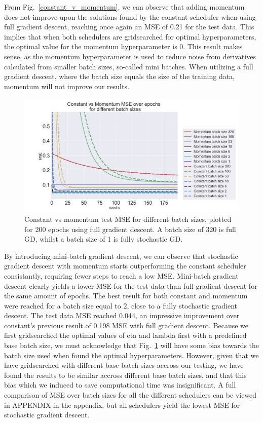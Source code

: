 \documentclass[onecolumn,10pt,cleanfoot]{asme2ej}
\begin{document}
From  Fig.~\ref{constant_v_momentum}, we can observe that adding momentum does not improve upon the solutions found by the constant scheduler when using full gradient descent, reaching once again an MSE of 0.21 for the test data. This implies that when both schedulers are gridsearched for optimal hyperparameters, the optimal value for the momentum hyperparameter is 0. This result makes sense, as the momentum hyperparameter is used to reduce noise from derivatives calculated from smaller batch sizes, so-called mini batches. When utilizing a full gradient descent, where the batch size equals the size of the training data, momentum will not improve our results.

\begin{figure}[h]
\centerline{\includegraphics[width=5in]{figure/SGD_batch_momentum_constant.png}}
\caption{Constant vs momentum test MSE for different batch sizes, plotted for 200 epochs using full gradient descent. A batch size of 320 is full GD, whilst a batch size of 1 is fully stochastic GD.}
\label{batch_constant_v_momentum}
\end{figure}

By introducing mini-batch gradient descent, we can observe that stochastic gradient descent with momentum starts outperforming the constant scheduler consistantly, requiring fewer steps to reach a low MSE. Mini-batch gradient descent clearly yields a lower MSE for the test data than full gradient descent for the same amount of epochs. The best result for both constant and momentum were reached for a batch size equal to 2, close to a fully stochastic gradient descent. The test data MSE reached 0.044, an impressive improvement over constant's previous result of 0.198 MSE with full gradient descent. Because we first gridsearched the optimal values of eta and lambda first with a predefined base batch size, we must acknowledge that Fig.~\ref{batch_constant_v_momentum} will have some bias towards the batch size used when found the optimal hyperparameters. However, given that we have gridsearched with different base batch sizes accross our testing, we have found the results to be similar accross different base batch sizes, and that this bias which we induced to save computational time was insignificant. A full comparison of MSE over batch sizes for all the different schedulers can be viewed in APPENDIX in the appendix, but all schedulers yield the lowest MSE for stochastic gradient descent.
\end{document}
